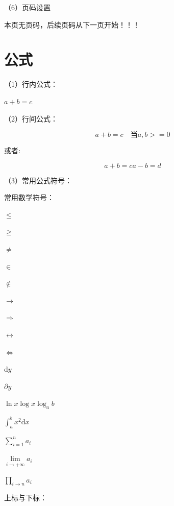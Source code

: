 \documentclass[a4paper]{article}
\begin{document}
（6）页码设置

本页无页码，后续页码从下一页开始！！！
\thispagestyle{empty} %
\newpage
\setcounter{page}{5}

\section{公式} %
（1）行内公式：

$a+b=c$ %

（2）行间公式：

\begin{equation}
    a+b=c \quad \text{当}a,b>=0 %
\end{equation}

或者:

\begin{subequations} %
\begin{equation}
    a+b=c
\end{equation}

\begin{equation}
    a-b=d 
\end{equation}
\end{subequations}

（3）常用公式符号：

常用数学符号：

$\le$  %

$\ge$  %

$\neq$  %

$\in$  %

$\notin$  %

$\rightarrow$  %

$\Rightarrow$  %

$\leftrightarrow$  %

$\Leftrightarrow$  %

$\mathrm{d} y$  %

$\partial y$  %

$\ln x$\quad$\log x$\quad$\log_{a}{b}$  %

$\int_{a}^{b} x^2 \mathrm{d} x$  %

$\sum\limits_{i=1}^{n}{a_{i}}$  %

$\lim\limits_{i\to +\infty}{a_{i}}$  %

$\prod\limits_{i\to n}{a_{i}}$  %

上标与下标：
\end{document}
